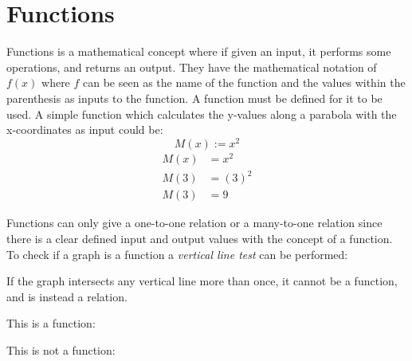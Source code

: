 \documentclass{book}
\begin{document}
\section{Functions}
Functions is a mathematical concept where if given an input, it performs some operations, and returns an output.  They have the mathematical notation of $f(x)$ where $f$ can be seen as the name of the function and the values within the parenthesis as inputs to the function.  A function must be defined for it to be used.  A simple function which calculates the y-values along a parabola with the x-coordinates as input could be:
\[
	M(x) := x^2
\]
\begin{align*}
	M(x) & = x^2   \\
	M(3) & = (3)^2 \\
	M(3) & = 9
\end{align*}

Functions can only give a one-to-one relation or a many-to-one relation since there is a clear defined input and output values with the concept of a function.  To check if a graph is a function a \emph{vertical line test} can be performed:
\begin{center}
	If the graph intersects any vertical line more than once, it cannot be a function, and is instead a relation.
\end{center}
\begin{center}
	This is a function:
	\begin{center}
	\end{center}
\end{center}
\begin{center}
	This is not a function:
	\begin{center}
	\end{center}
\end{center}
\end{document}
